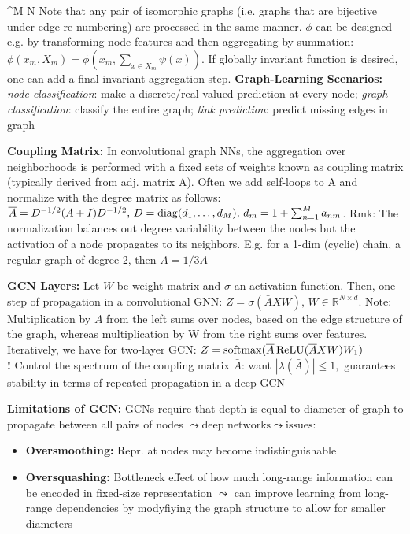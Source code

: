  \in {}^{M \times N}\)\newline
 Note that any pair of isomorphic graphs (i.e. graphs that are bijective under edge re-numbering) are processed in the same manner. \(\phi\) can be designed e.g. by transforming node features and then aggregating by summation: \(\phi(x_m, X_m) = \phi(x_m, \sum_{x\in X_m} \psi(x))\). If globally invariant function is desired, one can add a final invariant aggregation step.
\textbf{Graph-Learning Scenarios:} \textit{node classification}: make a discrete/real-valued prediction at every node; \textit{graph classification}: classify the entire graph; \textit{link prediction}: predict missing edges in graph

\textbf{Coupling Matrix:} In convolutional graph NNs, the aggregation over neighborhoods is performed with a fixed sets of weights known as coupling matrix (typically derived from adj. matrix A). Often we add self-loops to A and normalize with the degree matrix as follows: \(\overline{A} = D^{-1/2} (A+I)D^{-1/2}, \, D = \operatorname{diag}(d_1, \ldots, d_M),\, d_m = 1+\sum_{n=1}^M a_{nm}\). Rmk: The normalization balances out degree variability between the nodes but the activation of a node propagates to its neighbors. E.g. for a 1-dim (cyclic) chain, a regular graph of degree 2, then \(\bar{A}=1/3 A\)

\textbf{GCN Layers:} Let \(W\) be weight matrix and \(\sigma\) an activation function. Then, one step of propagation in a convolutional GNN: \(Z = \sigma(\bar{A}XW), \, W\in \mathbb{R}^{N\times d}\). Note: Multiplication by \(\bar{A}\) from the left sums over nodes, based on the edge structure of the graph, whereas multiplication by W from the right sums over features. Iteratively, we have for two-layer GCN: \(Z = \operatorname{softmax}(\overline{A} \operatorname{ReLU}(\overline{A}XW)W_1)\)\\
\textbf{!} Control the spectrum of the coupling matrix \(\bar{A}\): want \(|\lambda(\bar{A})|\leq 1,\) \textrightarrow guarantees stability in terms of repeated propagation in a deep GCN

\textbf{Limitations of GCN:} GCNs require that depth is equal to diameter of graph to propagate between all pairs of nodes \(\leadsto \text{deep networks} \leadsto \text{issues}:\)
\begin{itemize}
    \item \textbf{Oversmoothing:} Repr. at nodes may become indistinguishable
    \item \textbf{Oversquashing:} Bottleneck effect of how much long-range information can be encoded in fixed-size representation \(\leadsto\) can improve learning from long-range dependencies by modyfiying the graph structure to allow for smaller diameters
\end{itemize}

